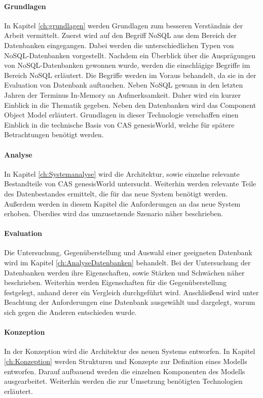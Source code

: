 \paragraph{Grundlagen} In Kapitel \ref{ch:grundlagen} werden Grundlagen zum besseren Verständnis der Arbeit vermittelt. Zuerst wird auf den Begriff NoSQL aus dem Bereich der Datenbanken eingegangen. Dabei werden die unterschiedlichen Typen von NoSQL-Datenbanken vorgestellt. Nachdem ein Überblick über die Ausprägungen von NoSQL-Datenbanken gewonnen wurde, werden die einschlägige Begriffe im Bereich NoSQL erläutert. Die Begriffe werden im Voraus behandelt, da sie in der Evaluation von Datenbank auftauchen. Neben NoSQL gewann in den letzten Jahren der Terminus In-Memory an Aufmerksamkeit. Daher wird ein kurzer Einblick in die Thematik gegeben. Neben den Datenbanken wird das Component Object Model erläutert. Grundlagen in dieser Technologie verschaffen einen Einblick in die technische Basis von CAS genesisWorld, welche für spätere Betrachtungen benötigt werden. 

\paragraph{Analyse} In Kapitel \ref{ch:Systemanalyse} wird die Architektur, sowie einzelne relevante Bestandteile von CAS genesisWorld untersucht. Weiterhin werden relevante Teile des Datenbestandes ermittelt, die für das neue System benötigt werden. Außerdem werden in diesem Kapitel die Anforderungen an das neue System erhoben. Überdies wird das umzusetzende Szenario näher beschrieben. 

\paragraph{Evaluation} Die Untersuchung, Gegenüberstellung und Auswahl einer geeigneten Datenbank wird im Kapitel \ref{ch:AnalyseDatenbanken} behandelt. Bei der Untersuchung der Datenbanken werden ihre Eigenschaften, sowie Stärken und Schwächen näher beschrieben. Weiterhin werden Eigenschaften für die Gegenüberstellung festgelegt, anhand derer ein Vergleich durchgeführt wird. Anschließend wird unter Beachtung der Anforderungen eine Datenbank ausgewählt und dargelegt, warum sich gegen die Anderen entschieden wurde.  

\paragraph{Konzeption} In der Konzeption wird die Architektur des neuen Systems entworfen. In Kapitel \ref{ch:Konzeption} werden Strukturen und Konzepte zur Definition eines Modells entworfen. Darauf aufbauend werden die einzelnen Komponenten des Modells ausgearbeitet. Weiterhin werden die zur Umsetzung benötigten Technologien  erläutert. 

